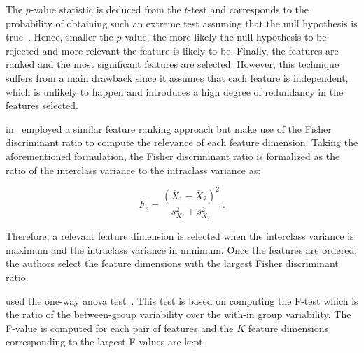 The $p$-value statistic is deduced from the $t$-test and corresponds to the
probability of obtaining such an extreme test assuming that the null hypothesis
is true~\cite{Goodman1999}.
Hence, smaller the $p$-value, the more likely the null hypothesis to be
rejected and more relevant the feature is likely to be.
Finally, the features are ranked and the most significant features are selected.
However, this technique suffers from a main drawback since it assumes that each
feature is independent, which is unlikely to happen and introduces a high
degree of redundancy in the features selected.

\citeauthor{Vos2012} in~\cite{Vos2012} employed a similar feature ranking
approach but make use of the Fisher discriminant ratio to compute the relevance
of each feature dimension.
Taking the aforementioned formulation, the Fisher discriminant ratio is
formalized as the ratio of the interclass variance to the intraclass variance
as:

\begin{equation}
  F_r = \frac{(\bar{X}_1 - \bar{X}_2)^2}{s^{2}_{X_1}+s^{2}_{X_2}} \ .
  \label{eq:fisherratio}
\end{equation}

Therefore, a relevant feature dimension is selected when the interclass
variance is maximum and the intraclass variance in minimum.
Once the features are ordered, the authors select the feature dimensions with
the largest Fisher discriminant ratio.

\citeauthor{Lemaitre2016thesis} used the one-way \ac{anova}
test~\cite{Lemaitre2016thesis}.
This test is based on computing the F-test which is the ratio of the
between-group variability over the with-in group variability.
The F-value is computed for each pair of features and the $K$ feature
dimensions corresponding to the largest F-values are kept.

